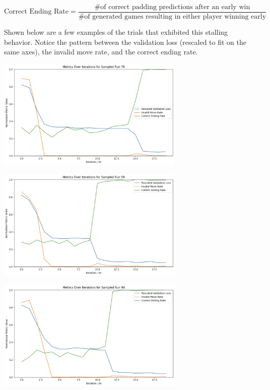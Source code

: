 \documentclass[11pt]{article}
\begin{document}
\[
\text{Correct Ending Rate} = \frac{\text{\# of correct padding predictions after an early win}}{\text{\# of generated games resulting in either player winning early}}
\]

Shown below are a few examples of the trials that exhibited this
stalling behavior. Notice the pattern between the validation loss
(rescaled to fit on the same axes), the invalid move rate, and the
correct ending rate.

\begin{center}
\includegraphics[width=0.67\textwidth,keepaspectratio]{inserted_images/ex1.png}

\vspace{1em} 

\includegraphics[width=0.67\textwidth,keepaspectratio]{inserted_images/ex2.png}

\vspace{1em}

\includegraphics[width=0.67\textwidth,keepaspectratio]{inserted_images/ex3.png}
\end{center}
\end{document}
